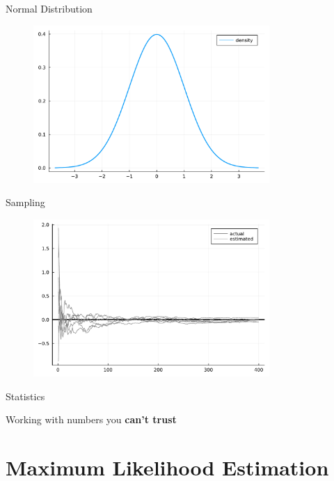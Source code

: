 \documentclass[aspectratio=169,xcolor=svgnames]{beamer}
\begin{document}
\begin{frame}{Normal Distribution}
  \begin{figure}[ht]
    \centering
    \includegraphics[width=0.8\textwidth]{figures/normal_distribution.pdf}
  \end{figure}
\end{frame}

\begin{frame}{Sampling}
  \begin{figure}[ht]
    \centering
    \includegraphics[width=0.8\textwidth]{figures/mean_error.pdf}
  \end{figure}
\end{frame}

\begin{frame}
  \huge{Statistics}

  Working with numbers you \textbf{can't trust}
\end{frame}

\section{Maximum Likelihood Estimation}
\end{document}
